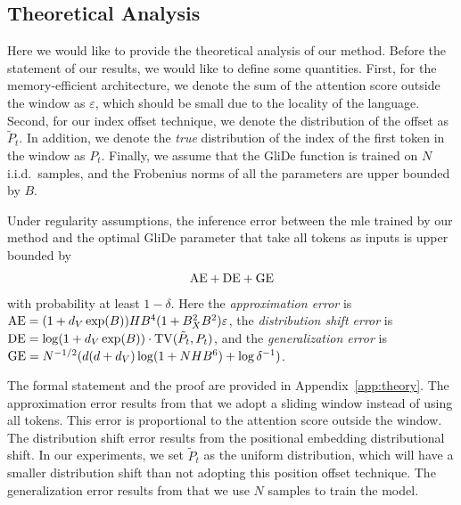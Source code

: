\subsection{Theoretical Analysis}
\label{subsec: theoretical analysis}
Here we would like to provide the theoretical analysis of our method. Before the statement of our results, we would like to define some quantities. First, for the memory-efficient architecture, we denote the sum of the attention score outside the window as $\varepsilon$, which should be small due to the locality of the language. Second, for our index offset technique, we denote the distribution of the offset as $\tilde{P}_t$. In addition, we denote the \emph{true} distribution of the index of the first token in the window as $P_t$. Finally, we assume that the GliDe function is trained on $N$ i.i.d.\ samples, and the Frobenius norms of all the parameters are upper bounded by $B$. %
\begin{theorem}[Informal]\label{thm:informal}
    Under regularity assumptions, the inference error between the \ac{mle} trained by our method and the optimal GliDe parameter that take all tokens as inputs is upper bounded by
    \begin{align*}
        \mathrm{A}\mathrm{E} + \mathrm{D}\mathrm{E} +\mathrm{G}\mathrm{E}
    \end{align*}
    with probability at least $1-\delta$. Here the \emph{approximation error} is $\mathrm{A}\mathrm{E}=(1+d_V\exp(B))HB^{4}(1+B_{X}^2B^2)\varepsilon$, the \emph{distribution shift error} is $\mathrm{D}\mathrm{E}=\log (1+d_V\exp(B))\cdot \mathop{\mathrm{TV}}(\tilde{P}_t,P_t)$, and the \emph{generalization error} is $\mathrm{G}\mathrm{E}=N^{-1/2}(d(d+d_V)\log (1+NHB^6)+\log\delta^{-1})$.
\end{theorem}
The formal statement and the proof are provided in Appendix~\ref{app:theory}. The approximation error results from that we adopt a sliding window instead of using all tokens. This error is proportional to the attention score outside the window. The distribution shift error results from the positional embedding distributional shift. In our experiments, we set $\tilde{P}_{t}$ as the uniform distribution, which will have a smaller distribution shift than not adopting this position offset technique. The generalization error results from that we use $N$ samples to train the model.






